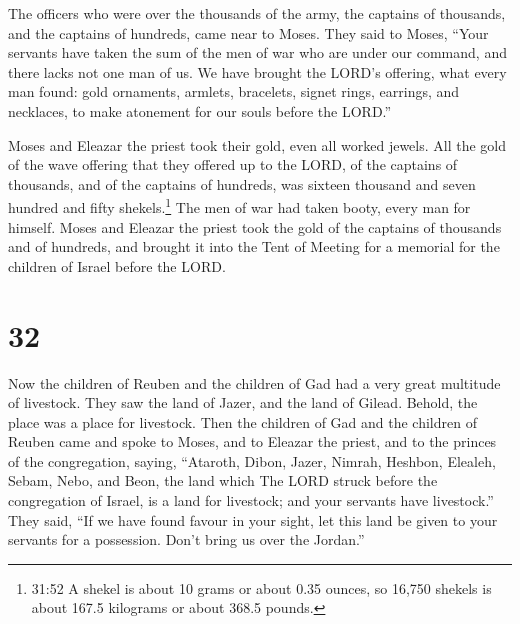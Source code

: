  The officers who were over the thousands of the army, the
captains of thousands, and the captains of hundreds, came near to Moses.
 They said to Moses, ``Your servants have taken the sum of
the men of war who are under our command, and there lacks not one man of
us.  We have brought the LORD's offering, what every man
found: gold ornaments, armlets, bracelets, signet rings, earrings, and
necklaces, to make atonement for our souls before the LORD.''

 Moses and Eleazar the priest took their gold, even all
worked jewels.  All the gold of the wave offering that they
offered up to the LORD, of the captains of thousands, and of the
captains of hundreds, was sixteen thousand and seven hundred and fifty
shekels.\footnote{31:52 A shekel is about 10 grams or about 0.35 ounces,
  so 16,750 shekels is about 167.5 kilograms or about 368.5 pounds.}
 The men of war had taken booty, every man for himself.
 Moses and Eleazar the priest took the gold of the captains
of thousands and of hundreds, and brought it into the Tent of Meeting
for a memorial for the children of Israel before the LORD.

\hypertarget{section-31}{%
\section{32}\label{section-31}}

 Now the children of Reuben and the children of Gad had a
very great multitude of livestock. They saw the land of Jazer, and the
land of Gilead. Behold, the place was a place for livestock.
 Then the children of Gad and the children of Reuben came
and spoke to Moses, and to Eleazar the priest, and to the princes of the
congregation, saying,  ``Ataroth, Dibon, Jazer, Nimrah,
Heshbon, Elealeh, Sebam, Nebo, and Beon,  the land which The
LORD struck before the congregation of Israel, is a land for livestock;
and your servants have livestock.''  They said, ``If we have
found favour in your sight, let this land be given to your servants for
a possession. Don't bring us over the Jordan.''

